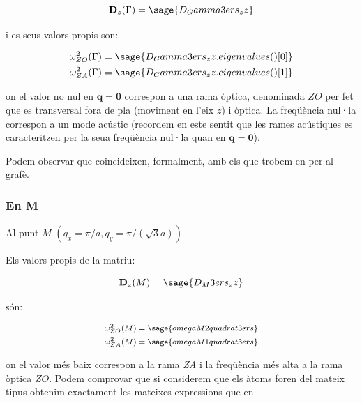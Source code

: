 \documentclass[12pt]{article} %
\let\vec\mathbf %
\begin{document}
\begin{equation}
\vec D_z(\Gamma)=\sage{D_Gamma3ers_zz}
\end{equation}

i es seus valors propis son:

\begin{equation}\begin{split}
\omega_{ZO}^2(\Gamma)&=\sage{D_Gamma3ers_zz.eigenvalues()[0]}\\
\omega_{ZA}^2(\Gamma)&=\sage{D_Gamma3ers_zz.eigenvalues()[1]} 
\end{split}
\end{equation}



on el valor no nul en $\vec q=\vec 0$ correspon a una rama òptica, denominada $ZO$ per fet que es transversal fora de pla (moviment en l'eix $z$) i òptica. La freqüència nul·la correspon a un mode acústic (recordem en este sentit que les rames acústiques es caracteritzen per la seua freqüència nul·la quan en $\vec q=\vec 0$). 

Podem observar que coincideixen, formalment, amb els que trobem en \cite{falkovsky08_symmet_const_phonon_disper_graph} per al grafè.

\subsubsection{En M}

Al punt $M$ $\left(q_x=\pi/a,q_y=\pi/(\sqrt 3 a)\right)$

Els valors propis de la matriu:

\begin{equation}
\vec D_z(M)=\sage{D_M3ers_zz}
\end{equation}

són:

\begin{equation}\footnotesize{
 \begin{split}
\omega_{ZO}^2(M)&={\sage{omegaM2quadrat3ers}}\\
\omega_{ZA}^2(M)&=\sage{omegaM1quadrat3ers}
 \end{split}}
\end{equation}

on el valor més baix correspon a la rama \emph{ZA} i la freqüència més alta a la rama òptica $ZO$.
Podem comprovar que si considerem que els àtoms foren del mateix tipus obtenim exactament les mateixes expressions que en \cite{falkovsky08_symmet_const_phonon_disper_graph}
\end{document}
